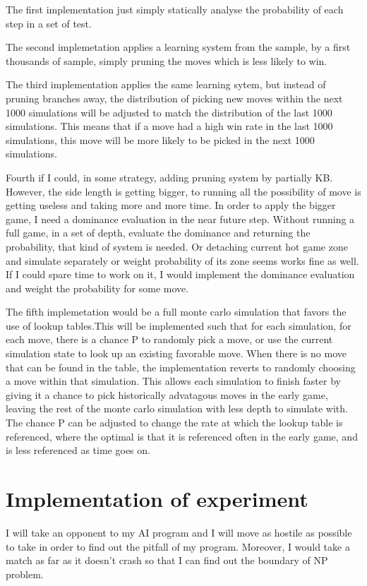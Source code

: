 \documentclass[11pt]{article}
\begin{document}
The first implementation just simply statically analyse the probability of each step in a set of test\cite{abramson1990expected}. 

The second implemetation applies a learning system from the sample, by a first thousands of sample, simply pruning the moves which is less likely to win\cite{brugmann1993monte}.

The third implementation applies the same learning sytem, but instead of pruning branches away, the distribution of picking new moves within the next 1000 simulations will be adjusted to match the distribution of the last 1000 simulations. This means that if a move had a high win rate in the last 1000 simulations, this move will be more likely to be picked in the next 1000 simulations.

Fourth if I could, in some strategy, adding pruning system by partially KB. However, the side length is getting bigger, to running all the possibility of move is getting useless and taking more and more time\cite{bouzy2004monte}. In order to apply the bigger game, I need a dominance evaluation in the near future step. Without running a full game, in a set of depth, evaluate the dominance and returning the probability, that kind of system is needed. Or detaching current hot game zone and simulate separately or weight probability of its zone seems works fine as well. If I could spare time to work on it, I would implement the dominance evaluation and weight the probability for some move. 

The fifth implemetation would be a full monte carlo simulation that favors the use of lookup tables.This will be implemented such that for each simulation, for each move, there is a chance P to randomly pick a move, or use the current simulation state to look up an existing favorable move. When there is no move that can be found in the table, the implementation reverts to randomly choosing a move within that simulation. This allows each simulation to finish faster by giving it a chance to pick historically advatagous moves in the early game, leaving the rest of the monte carlo simulation with less depth to simulate with. The chance P can be adjusted to change the rate at which the lookup table is referenced, where the optimal is that it is referenced often in the early game, and is less referenced as time goes on.

\section{Implementation of experiment} 
I will take an opponent to my AI program and I will move as hostile as possible to take in order to find out the pitfall of my program. Moreover, I would take a match as far as it doesn't crash so that I can find out the boundary of NP problem.
\end{document}
